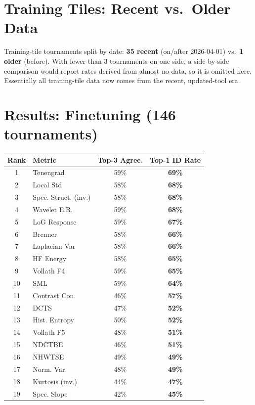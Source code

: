 \documentclass[11pt]{article}
\begin{document}
\section{Training Tiles: Recent vs.\ Older Data}

Training-tile tournaments split by date: \textbf{35 recent} (on/after 2026-04-01) vs.\ \textbf{1 older} (before). With fewer than 3 tournaments on one side, a side-by-side comparison would report rates derived from almost no data, so it is omitted here. Essentially all training-tile data now comes from the recent, updated-tool era.

\section{Results: Finetuning (146 tournaments)}

\vspace{0.5em}
\begin{center}
\small
\begin{tabular}{clcc}
\toprule
\textbf{Rank} & \textbf{Metric} & \textbf{Top-3 Agree.} & \textbf{Top-1 ID Rate} \\
\midrule
\rowcolor{toprow} 1 & Tenengrad & 59\% & \textbf{69\%} \\
\rowcolor{toprow} 2 & Local Std & 58\% & \textbf{68\%} \\
\rowcolor{toprow} 3 & Spec. Struct. (inv.) & 58\% & \textbf{68\%} \\
\rowcolor{toprow} 4 & Wavelet E.R. & 59\% & \textbf{68\%} \\
\rowcolor{toprow} 5 & LoG Response & 59\% & \textbf{67\%} \\
\rowcolor{toprow} 6 & Brenner & 58\% & \textbf{66\%} \\
\rowcolor{toprow} 7 & Laplacian Var & 58\% & \textbf{66\%} \\
\rowcolor{toprow} 8 & HF Energy & 58\% & \textbf{65\%} \\
\rowcolor{toprow} 9 & Vollath F4 & 59\% & \textbf{65\%} \\
\rowcolor{toprow} 10 & SML & 59\% & \textbf{64\%} \\
\rowcolor{toprow} 11 & Contrast Con. & 46\% & \textbf{57\%} \\
\rowcolor{toprow} 12 & DCTS & 47\% & \textbf{52\%} \\
\rowcolor{toprow} 13 & Hist. Entropy & 50\% & \textbf{52\%} \\
\rowcolor{toprow} 14 & Vollath F5 & 48\% & \textbf{51\%} \\
\rowcolor{toprow} 15 & NDCTBE & 46\% & \textbf{51\%} \\
\rowcolor{toprow} 16 & NHWTSE & 49\% & \textbf{49\%} \\
\rowcolor{toprow} 17 & Norm. Var. & 48\% & \textbf{49\%} \\
\rowcolor{toprow} 18 & Kurtosis (inv.) & 44\% & \textbf{47\%} \\
\rowcolor{toprow} 19 & Spec. Slope & 42\% & \textbf{45\%} \\
\bottomrule
\end{tabular}
\end{center}
\end{document}
